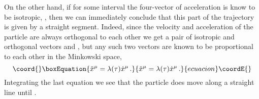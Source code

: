 \documentclass[a4paper,12pt]{article}
\begin{document}
On the other hand, if for some interval \coordHE{} the
four-vector of acceleration is know to be isotropic,
\coordHE{}, then we can immediately conclude that this part of
the trajectory is given by a straight segment. Indeed, since the
velocity and acceleration of the particle are always orthogonal to
each other we get a pair of isotropic and orthogonal vectors
\coordHE{} and \coordHE{}, but any such two vectors are
known to be proportional to each other in the Minkowski space,
\begin{equation}\coord{}\boxEquation{\label{}
  \ddot{x}^\mu=\lambda(\tau)\dot{x}^\mu\,.
}{\ddot{x}^\mu=\lambda(\tau)\dot{x}^\mu\,.
}{ecuacion}\coordE{}\end{equation}
Integrating the last equation we see that the particle does move
along a straight line until \coordHE{}.
\end{document}
